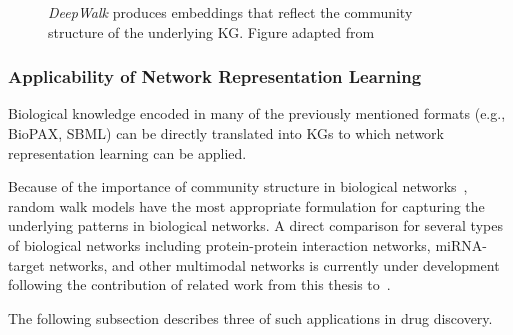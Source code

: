 \begin{figure}
    \captionsetup{format=plain}
    \caption[DeepWalk Embeddings Reflect Community Structure]{\textit{DeepWalk} produces embeddings that reflect the community structure of the underlying \ac{KG}. Figure adapted from ~\cite{Perozzi2014}}
    \label{fig:deepwalk_embedding}
\end{figure}

\subsubsection{Applicability of Network Representation Learning}

Biological knowledge encoded in many of the previously mentioned formats (e.g., \ac{BioPAX}, \ac{SBML}) can be directly translated into \acp{KG} to which network representation learning can be applied.

Because of the importance of community structure in biological networks~\cite{Girvan2002}, random walk models have the most appropriate formulation for capturing the underlying patterns in biological networks.
A direct comparison for several types of biological networks including protein-protein interaction networks, miRNA-target networks, and other multimodal networks is currently under development following the contribution of related work from this thesis to~\cite{Ali2019}.

The following subsection describes three of such applications in drug discovery.
